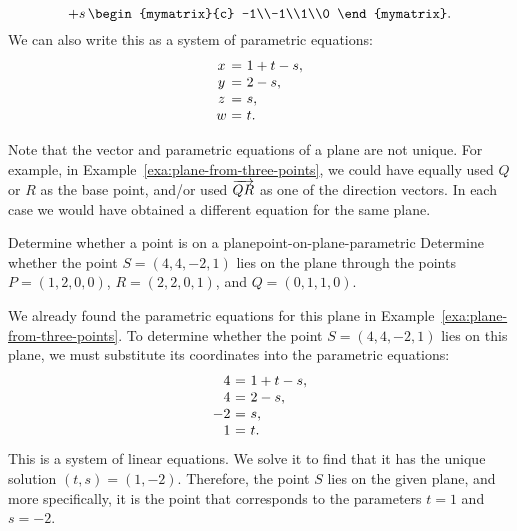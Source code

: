 \begin{solution}
\begin{equation*}
    + s\,\begin{mymatrix}{c} -1\\-1\\1\\0 \end{mymatrix}.
  \end{equation*}
  We can also write this as a system of parametric equations:
  \begin{equation*}
    \begin{array}{c@{~}c@{~}l}
      x &=& 1 + t - s, \\
      y &=& 2 - s, \\
      z &=& s, \\
      w &=& t.
    \end{array}
  \end{equation*}
\end{solution}

Note that the vector and parametric equations of a plane are not
unique. For example, in Example~\ref{exa:plane-from-three-points}, we
could have equally used $Q$ or $R$ as the base point, and/or used
$\overrightarrow{QR}$ as one of the direction vectors. In each case we would
have obtained a different equation for the same plane.

\begin{example}{Determine whether a point is on a plane}{point-on-plane-parametric}
  Determine whether the point $S=(4,4,-2,1)$ lies on the plane through
  the points $P = (1,2,0,0)$, $R = (2,2,0,1)$, and
  $Q = (0,1,1,0)$.
\end{example}

\begin{solution}
  We already found the parametric equations for this plane in
  Example~\ref{exa:plane-from-three-points}. To determine whether the
  point $S=(4,4,-2,1)$ lies on this plane, we must substitute its
  coordinates into the parametric equations:
  \begin{equation*}
    \begin{array}{r@{~}c@{~}l}
      4 &=& 1 + t - s, \\
      4 &=& 2 - s, \\
      -2 &=& s, \\
      1 &=& t.
    \end{array}
  \end{equation*}
  This is a system of linear equations. We solve it to find that it
  has the unique solution $(t,s) = (1,-2)$. Therefore, the point $S$
  lies on the given plane, and more specifically, it is the point that
  corresponds to the parameters $t=1$ and $s=-2$.
\end{solution}

